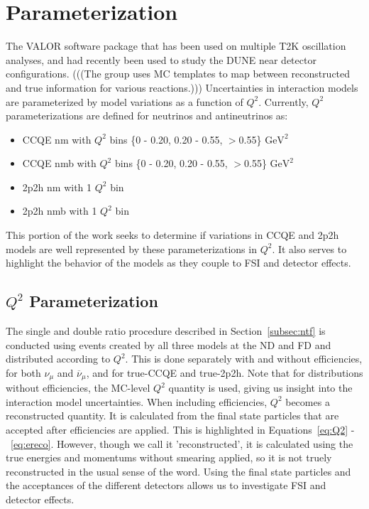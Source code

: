 \documentclass[12pt]{article}
\begin{document}
\section{Parameterization}
The VALOR software package that has been used on multiple T2K oscillation analyses, and had recently been used to study the DUNE near detector configurations. (((The group uses MC templates to map between reconstructed and true information for various reactions.))) Uncertainties in interaction models are parameterized by model variations as a function of $Q^2$. Currently, $Q^2$ parameterizations are defined for neutrinos and antineutrinos as: 
\begin{itemize}
\item CCQE nm with $Q^2$ bins \{0 - 0.20, 0.20 - 0.55, $>$0.55\} $\textrm{GeV}^2$
\item CCQE nmb with $Q^2$ bins \{0 - 0.20, 0.20 - 0.55, $>$0.55\} $\textrm{GeV}^2$
\item 2p2h nm with 1 $Q^2$ bin 
\item 2p2h nmb with 1 $Q^2$ bin
\end{itemize}

This portion of the work seeks to determine if variations in CCQE and 2p2h models are well represented by these parameterizations in $Q^2$. It also serves to highlight the behavior of the models as they couple to FSI and detector effects.

\subsection{$Q^2$ Parameterization}
\label{subsec:q2}
The single and double ratio procedure described in Section~\ref{subsec:ntf} is conducted using events created by all three models at the ND and FD and distributed according to $Q^2$. This is done separately with and without efficiencies, for both $\nu_{\mu}$ and $\overline{\nu}_{\mu}$, and for true-CCQE and true-2p2h. Note that for distributions without efficiencies, the MC-level $Q^2$ quantity is used, giving us insight into the interaction model uncertainties. When including efficiencies, $Q^2$ becomes a reconstructed quantity. It is calculated from the final state particles that are accepted after efficiencies are applied. This is highlighted in Equations~\ref{eq:Q2} - ~\ref{eq:ereco}. However, though we call it 'reconstructed', it is calculated using the true energies and momentums without smearing applied, so it is not truely reconstructed in the usual sense of the word. Using the final state particles and the acceptances of the different detectors allows us to investigate FSI and detector effects.
\end{document}
